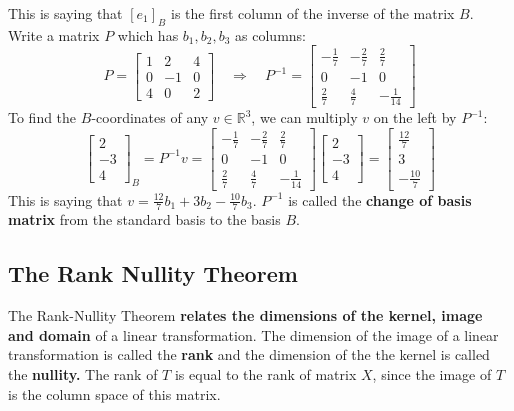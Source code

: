 \documentclass[a4paper, 9pt]{extarticle}
\begin{document}
This is saying that $[e_1]_B$ is the first column of the inverse of the matrix $B$. Write a matrix $P$ which has $b_1, b_2, b_3$ as columns:
$$
  P = \begin{bmatrix}
    1 & 2  & 4 \\
    0 & -1 & 0 \\
    4 & 0  & 2
  \end{bmatrix}
  \quad\Longrightarrow\quad
  P^{-1} =
  \begin{bmatrix}
    -\tfrac{1}{7} & -\tfrac{2}{7} & \tfrac{2}{7}   \\
    0             & -1            & 0              \\
    \tfrac{2}{7}  & \tfrac{4}{7}  & -\tfrac{1}{14}
  \end{bmatrix}
$$
To find the $B$-coordinates of any $v \in \mathbb{R}^3$, we can multiply $v$ on the left by $P^{-1}$:
$$
  \begin{bmatrix}
    2  \\
    -3 \\
    4
  \end{bmatrix}_B
  =
  P^{-1}v =
  \begin{bmatrix}
    -\tfrac{1}{7} & -\tfrac{2}{7} & \tfrac{2}{7}   \\
    0             & -1            & 0              \\
    \tfrac{2}{7}  & \tfrac{4}{7}  & -\tfrac{1}{14}
  \end{bmatrix}
  \begin{bmatrix}
    2  \\
    -3 \\
    4
  \end{bmatrix}
  =
  \begin{bmatrix}
    \tfrac{12}{7} \\
    3             \\
    -\tfrac{10}{7}
  \end{bmatrix}
$$
This is saying that $v = \tfrac{12}{7}b_1 + 3b_2 - \tfrac{10}{7}b_3$. $P^{-1}$ is called the \textbf{change of basis matrix} from the standard basis to the basis $B$.
\subsection{The Rank Nullity Theorem}
The Rank-Nullity Theorem \textbf{relates the dimensions of the kernel, image and domain} of a linear transformation. The dimension of the image of a linear transformation is called the \textbf{rank} and the dimension of the the kernel is called the \textbf{nullity.} The rank of $T$ is equal to the rank of matrix $X$, since the image of $T$ is the column space of this matrix.
\end{document}
